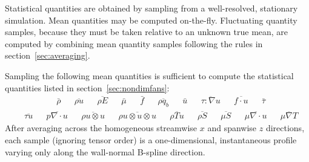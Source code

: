 \documentclass[letterpaper,11pt,nointlimits,reqno]{amsart}
\begin{document}
Statistical quantities are obtained by sampling from a well-resolved,
stationary simulation.  Mean quantities may be computed on-the-fly.
Fluctuating quantity samples, because they must be taken relative to an unknown
true mean, are computed by combining mean quantity samples following the rules
in section~\ref{sec:averaging}.

Sampling the following mean quantities is sufficient to compute
the statistical quantities listed in section~\ref{sec:nondimfans}:
\begin{align}
&\bar{\rho}
&
&\overline{\rho{}u}
&
&\overline{\rho{}E}
&
&\bar{\mu}
&
&\bar{f}
&
&\overline{\rho{}q_b}
&
&\bar{u}
&
&\overline{\tau:\nabla{}u}
&
&\overline{f\cdot{}u}
&
&\bar{\tau}
\end{align}
\begin{align}
&\overline{\tau{}u}
&
&\overline{p\nabla\cdot{}u}
&
&\overline{\rho{}u\otimes{}u}
&
&\overline{\rho{}u\otimes{}u\otimes{}u}
&
&\overline{\rho{}Tu}
&
&\overline{\rho{}S}
&
&\overline{\mu{}S}
&
&\overline{\mu\nabla\cdot{}u}
&
&\overline{\mu\nabla{}T}
\end{align}
After averaging across the homogeneous streamwise $x$ and spanwise $z$
directions, each sample (ignoring tensor order) is a one-dimensional,
instantaneous profile varying only along the wall-normal B-spline direction.
\end{document}
